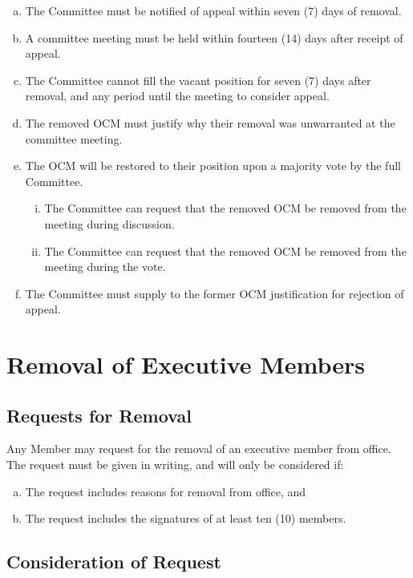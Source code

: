 \documentclass[a4paper,12pt]{article}
\begin{document}
\begin{enumerate}[a)]
	\item The Committee must be notified of appeal within seven (7) days of removal.
	\item A committee meeting must be held within fourteen (14) days after receipt of appeal.
	\item The Committee cannot fill the vacant position for seven (7) days after removal, and any period until the meeting to consider appeal.
	\item The removed OCM must justify why their removal was unwarranted at the committee meeting.
	\item The OCM will be restored to their position upon a majority vote by the full Committee.
	\begin{enumerate}[i)]
		\item The Committee can request that the removed OCM be removed from the meeting during discussion.
		\item The Committee can request that the removed OCM be removed from the meeting during the vote.
	\end{enumerate}
	\item The Committee must supply to the former OCM justification for rejection of appeal.
\end{enumerate}

\section{Removal of Executive Members}

\subsection{Requests for Removal}

Any Member may request for the removal of an executive member from office. The request must be given in writing, and will only be considered if:

\begin{enumerate}[a)]
	\item The request includes reasons for removal from office, and
	\item The request includes the signatures of at least ten (10) members.
\end{enumerate}

\subsection{Consideration of Request}
\end{document}
